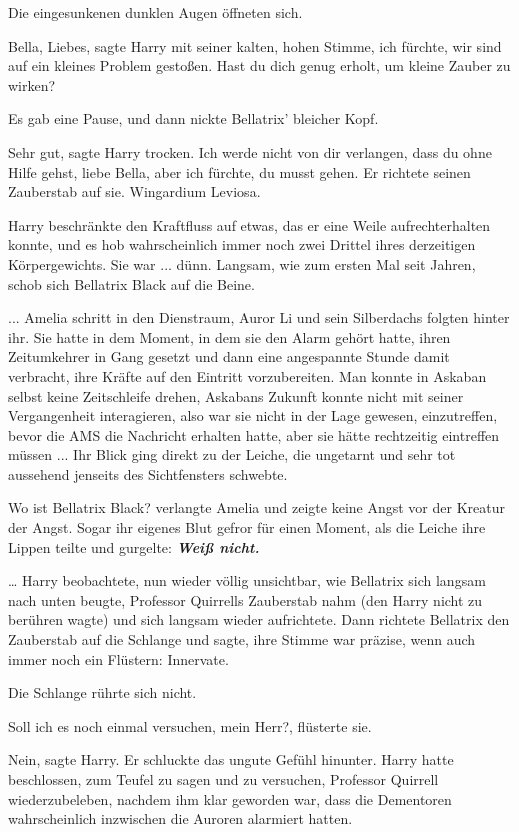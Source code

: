 Die eingesunkenen dunklen Augen öffneten sich.

\glqq{}Bella, Liebes\grqq{}, sagte Harry mit seiner kalten, hohen Stimme, \glqq{}
ich fürchte, wir sind auf ein kleines Problem gestoßen. Hast du dich genug
erholt, um kleine Zauber zu wirken?\grqq{}

Es gab eine Pause, und dann nickte Bellatrix' bleicher Kopf.

\glqq{}Sehr gut\grqq{}, sagte Harry trocken. \glqq{}Ich werde nicht von dir
verlangen, dass du ohne Hilfe gehst, liebe Bella, aber ich fürchte, du musst
gehen.\grqq{} Er richtete seinen Zauberstab auf sie. \glqq{}Wingardium Leviosa.\grqq{}

Harry beschränkte den Kraftfluss auf etwas, das er eine Weile aufrechterhalten
konnte, und es hob wahrscheinlich immer noch zwei Drittel ihres derzeitigen
Körpergewichts. Sie war ... dünn. Langsam, wie zum ersten Mal seit Jahren, schob
sich Bellatrix Black auf die Beine.

... Amelia schritt in den Dienstraum, Auror Li und sein Silberdachs folgten
hinter ihr. Sie hatte in dem Moment, in dem sie den Alarm gehört hatte, ihren
Zeitumkehrer in Gang gesetzt und dann eine angespannte Stunde damit verbracht,
ihre Kräfte auf den Eintritt vorzubereiten. Man konnte in Askaban selbst keine
Zeitschleife drehen, Askabans Zukunft konnte nicht mit seiner Vergangenheit
interagieren, also war sie nicht in der Lage gewesen, einzutreffen, bevor die
AMS die Nachricht erhalten hatte, aber sie hätte rechtzeitig eintreffen
müssen ... Ihr Blick ging direkt zu der Leiche, die ungetarnt und sehr tot
aussehend jenseits des Sichtfensters schwebte.

\glqq{}Wo ist Bellatrix Black?\grqq{} verlangte Amelia und zeigte keine Angst
vor der Kreatur der Angst. Sogar ihr eigenes Blut gefror für einen Moment, als
die Leiche ihre Lippen teilte und gurgelte: \textbf{\emph{\glqq{}Weiß
nicht.\grqq{}}}

… Harry beobachtete, nun wieder völlig unsichtbar, wie Bellatrix sich langsam
nach unten beugte, Professor Quirrells Zauberstab nahm (den Harry nicht zu
berühren wagte) und sich langsam wieder aufrichtete. Dann richtete Bellatrix den
Zauberstab auf die Schlange und sagte, ihre Stimme war präzise, wenn auch immer
noch ein Flüstern: \glqq{}Innervate.\grqq{}

Die Schlange rührte sich nicht.

\glqq{}Soll ich es noch einmal versuchen, mein Herr?\grqq{}, flüsterte sie.

\glqq{}Nein\grqq{}, sagte Harry. Er schluckte das ungute Gefühl hinunter. Harry
hatte beschlossen, zum Teufel zu sagen und zu versuchen, Professor Quirrell
wiederzubeleben, nachdem ihm klar geworden war, dass die Dementoren
wahrscheinlich inzwischen die Auroren alarmiert hatten.

